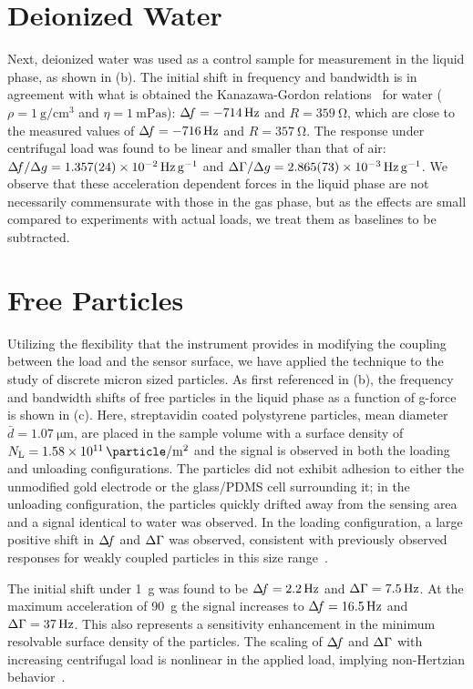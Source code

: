 \section{Deionized Water}
Next, deionized water was used as a control sample for measurement in the
liquid phase, as shown in (b).  The initial shift in
frequency and bandwidth is in agreement with what is obtained the Kanazawa-Gordon
relations~\cite{kanazawa1985frequency} for water
($\rho=\SI{1}{\gram\per\centi\meter\cubed}$ and
$\eta=\SI{1}{\milli\pascal\second}$): $\Delta\!f = \SI{-714}{\hertz}$ and
$R=\SI{359}{\ohm}$, which are close to the measured values of $\Delta\!f =
\SI{-716}{\hertz}$ and $R=\SI{357}{\ohm}$.  The response under centrifugal
load was found to be linear and smaller than that of air: $\df/\Delta g=
\SI{1.357+-0.024e-2}{\hertz \per\g}$ and $\dg/\Delta g=
\SI{2.865+-0.073e-3}{\hertz\per\g}$.  We observe that these acceleration
dependent forces in the liquid phase are not necessarily commensurate with
those in the gas phase, but as the effects are small compared to
experiments with actual loads, we treat them as baselines to be
subtracted.

\section{Free Particles}
Utilizing the flexibility that the instrument provides in modifying the
coupling between the load and the sensor surface, we have applied the
technique to the study of discrete micron sized particles.  As first
referenced in (b), the frequency and bandwidth shifts
of free particles in the liquid phase as a function of g-force is shown in
(c).  Here, streptavidin coated polystyrene particles,
mean diameter $\bar{d}=\SI{1.07}{\micro\meter}$, are placed in the sample volume with
a surface density of
$N_\mathrm{L}=\SI{1.58e11}{\particle\per\meter\squared}$ and the signal is
observed in both the loading and unloading configurations.
The particles
did not exhibit adhesion to either the unmodified gold electrode or the
glass/PDMS cell surrounding it; in the unloading configuration, the particles
quickly drifted away from the sensing area and a signal identical to water
was observed.  In the loading configuration, a large positive
shift in $\Delta\!f$ and $\Delta\Gamma$ was observed, consistent with
previously observed responses for weakly coupled particles in this size
range~\cite{johannsman2007contacts}.  

The initial shift under \SI{1}{g} was found to be $\Delta\!f=
\SI{2.2}{\hertz}$ and $\Delta\Gamma=\SI{7.5}{\hertz}$.  At the maximum acceleration of \SI{90}{g} the
signal increases to $\Delta\!f = \SI{16.5}{\hertz}$ and $\Delta\Gamma=\SI{37}{\hertz}$. This also
represents a sensitivity enhancement in the minimum resolvable surface
density of the particles.  The scaling of $\Delta\!f$ and $\Delta\Gamma$ with increasing
centrifugal load is nonlinear in the applied load, implying non-Hertzian
behavior~\cite{borovsky2001measuring}.

